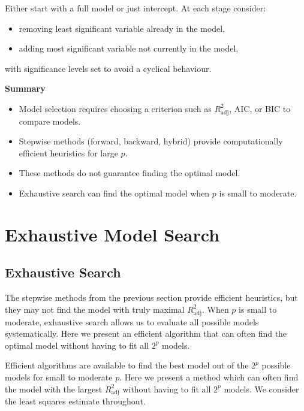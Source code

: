 \documentclass[
  a4paper,
]{article}
\providecommand{\tightlist}{%
  \setlength{\itemsep}{0pt}\setlength{\parskip}{0pt}}
\theoremstyle{definition}
\theoremstyle{definition}
\theoremstyle{definition}
\theoremstyle{definition}
\theoremstyle{remark}
\begin{document}
Either start with a full model or just intercept. At each stage consider:

\begin{itemize}
\tightlist
\item
  removing least significant variable already in the model,
\item
  adding most significant variable not currently in the model,
\end{itemize}

with significance levels set to avoid a cyclical behaviour.

\textbf{Summary}

\begin{itemize}
\tightlist
\item
  Model selection requires choosing a criterion such as \(R^2_\mathrm{adj}\),
  AIC, or BIC to compare models.
\item
  Stepwise methods (forward, backward, hybrid) provide computationally
  efficient heuristics for large \(p\).
\item
  These methods do not guarantee finding the optimal model.
\item
  Exhaustive search can find the optimal model when \(p\) is small to moderate.
\end{itemize}

\clearpage

\section{Exhaustive Model Search}\label{S13-exhaustive}

\subsection{Exhaustive Search}\label{exhaustive-search-1}

The stepwise methods from the previous section provide efficient
heuristics, but they may not find the model with truly maximal
\(R^2_\mathrm{adj}\). When \(p\) is small to moderate, exhaustive search
allows us to evaluate all possible models systematically. Here we
present an efficient algorithm that can often find the optimal model
without having to fit all \(2^p\) models.

Efficient algorithms are available to find the best model out of the
\(2^p\) possible models for small to moderate \(p\). Here we present
a method which can often find the model with the largest \(R^2_\mathrm{adj}\)
without having to fit all \(2^p\) models. We consider the least squares
estimate throughout.
\end{document}
